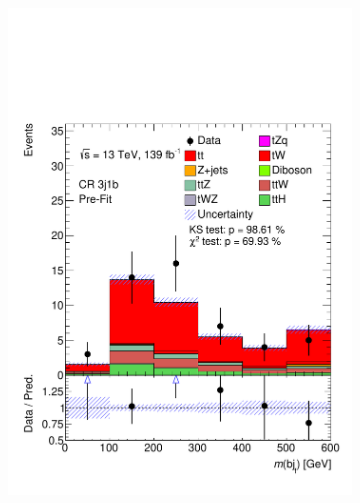 \begin{figure}[h!]
\begin{subfigure}[b]{0.33\linewidth}
    \includegraphics[width=\linewidth]{ubonn-thesis/Chapters/Chapters_05/Figure/CR_tt/CR_3j1b_M_bj.pdf} 
  \end{subfigure}%
  \newline
  \begin{subfigure}[b]{0.33\linewidth}
    \centering

\end{subfigure}
\end{figure}
